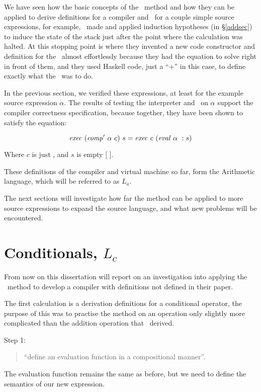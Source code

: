 \documentclass {article}
\begin{document}
We have seen how the basic concepts of the \BH\ method and
how they can be applied to derive definitions
for a compiler and \vm\ for a couple simple source 
expressions, for example, \BH\ made and applied induction
hypotheses (in \S\ref{addsec}) to induce 
the state of the stack just after the
point where the calculation was halted.
At this stopping point is where 
they invented a new code constructor and 
definition for the \vm\
almost effortlessly because they had the equation
to solve right in front of them, and they
used Haskell code, just a ``+'' in this case, 
to define exactly what the \vm\ was to do.

In the previous section, we verified these expressions, 
at least for the example source expression $\alpha$.
The results of testing the interpreter and \vm\ on $\alpha$
 support the compiler correctness specification,
because together, they have been shown to satisfy the equation:

\[ \Exec (\Compp \alpha\ c)\ s = \Exec c\ (\evalf \alpha\ : s) \]

\noindent Where $c$ is just \HALTt, and $s$ is empty [ ].

These definitions of the compiler and virtual machine so far,
form the Arithmetic language, which will be referred to as $L_a$.

The next sections will investigate how 
far the method can be applied to
more source expressions to expand the source language,
and what new problems will be encountered.



\pagebreak
\section{Conditionals, $L_c$} \label{langcond}

From now on this dissertation will report on an
investigation into applying the \BH\ method to develop a compiler
with definitions not defined in their paper\cite{bandh}.

The first calculation is a derivation
definitions for a conditional operator,
the purpose of this was to practise the method
on an operation only slightly more complicated than
the addition operation that \BH\ derived.

\newcommand{\ite}{\textit{Ite}}
\newcommand{\Ite}{\mathit{Ite\ }}
\newcommand{\String}{\mathit{String\ }}

Step 1: 
\begin{quote}
``define an evaluation function in a compositional manner''.
\end{quote}
The evaluation function remains 
the same as before,
but we need to define 
the semantics of our new expression.
\end{document}
